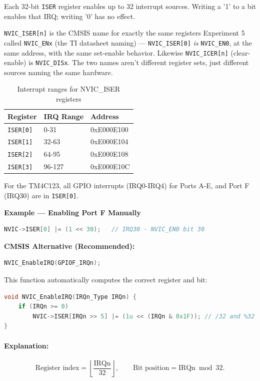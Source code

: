 \noindent
Each 32-bit \texttt{ISER} register enables up to 32 interrupt sources.
Writing a '1' to a bit enables that IRQ; writing '0' has no effect.

\noindent
\texttt{NVIC\_ISER[n]} is the CMSIS name for exactly the same registers Experiment 5 called \texttt{NVIC\_ENx} (the TI datasheet naming) — \texttt{NVIC\_ISER[0]} \emph{is} \texttt{NVIC\_EN0}, at the same address, with the same set-enable behavior. Likewise \texttt{NVIC\_ICER[n]} (clear-enable) is \texttt{NVIC\_DISx}. The two names aren't different register sets, just different sources naming the same hardware.

\begin{table}[H]
\centering
\small
\renewcommand{\arraystretch}{1.1}
\begin{tabular}{lll}
\toprule
\textbf{Register} & \textbf{IRQ Range} & \textbf{Address} \\
\midrule
\texttt{ISER[0]} & 0-31  & 0xE000E100 \\
\texttt{ISER[1]} & 32-63 & 0xE000E104 \\
\texttt{ISER[2]} & 64-95 & 0xE000E108 \\
\texttt{ISER[3]} & 96-127 & 0xE000E10C \\
\bottomrule
\end{tabular}
\caption{Interrupt ranges for NVIC\_ISER registers}
\end{table}

\noindent
For the TM4C123, all GPIO interrupts (IRQ0-IRQ4) for Ports A-E, and Port F (IRQ30) are in \texttt{ISER[0]}.
\bigskip


\noindent
\textbf{Example — Enabling Port F Manually}
\begin{lstlisting}[caption={Enable GPIO Port F interrupt manually}, language=C]
NVIC->ISER[0] |= (1 << 30);   // IRQ30 - NVIC_EN0 bit 30
\end{lstlisting}

\noindent
\textbf{CMSIS Alternative (Recommended):}
\begin{lstlisting}[language=C]
NVIC_EnableIRQ(GPIOF_IRQn);
\end{lstlisting}

\noindent
This function automatically computes the correct register and bit:
\begin{lstlisting}[language=C]
void NVIC_EnableIRQ(IRQn_Type IRQn) {
    if (IRQn >= 0)
        NVIC->ISER[IRQn >> 5] |= (1u << (IRQn & 0x1F)); // /32 and %32
}
\end{lstlisting}
\noindent
\paragraph{Explanation:}
\[
\text{Register index} = \left\lfloor \frac{\text{IRQn}}{32} \right\rfloor, \qquad
\text{Bit position} = \text{IRQn} \bmod 32.
\]

